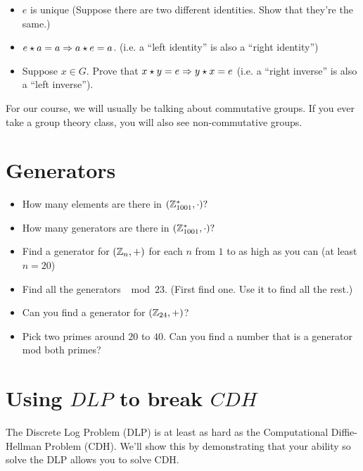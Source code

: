 \documentclass[12pt]{article}
\begin{document}
\begin{itemize}
\item $e$ is unique (Suppose there are two different identities. Show that they're the same.)
\item $e \star a = a \Rightarrow a \star e = a$. (i.e. a ``left identity'' is also a ``right identity'')
\item Suppose $x \in G$. Prove that $x \star y = e \Rightarrow y \star x = e$ (i.e. a ``right inverse'' is also a ``left inverse'').
\end{itemize}



For our course, we will usually be talking about commutative groups. If you ever take a group theory class, you will also see non-commutative groups.




\section{Generators}

\begin{itemize}
\item How many elements are there in $(\mathbb{Z}_{1001}^*, \cdot)?$
\item How many generators are there in $(\mathbb{Z}_{1001}^*, \cdot)?$
\item Find a generator for $(\mathbb{Z}_n, +)$ for each $n$ from $1$ to as high as you can (at least $n=20$)
\item Find all the generators $\mod 23$. (First find one. Use it to find all the rest.)
\item Can you find a generator for $(\mathbb{Z}_{24}, +)$?
\item Pick two primes around $20$ to $40$. Can you find a number that is a generator mod both primes?
\end{itemize}


\section{Using $DLP$ to break $CDH$}

The Discrete Log Problem (DLP) is at least as hard as the Computational Diffie-Hellman Problem (CDH). We'll show this by demonstrating that your ability so solve the DLP allows you to solve CDH.
\end{document}
